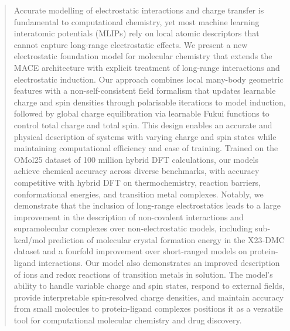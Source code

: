\documentclass[aps,%
superscriptaddress,
 amsmath,amssymb,
floatfix,
twocolumn
]{revtex4-2}
\begin{document}
\begin{abstract}
Accurate modelling of electrostatic interactions and charge transfer is fundamental to computational chemistry, yet most machine learning interatomic potentials (MLIPs) rely on local atomic descriptors that cannot capture long-range electrostatic effects. We present a new electrostatic foundation model for molecular chemistry that extends the MACE architecture with explicit treatment of long-range interactions and electrostatic induction. Our approach combines local many-body geometric features with a non-self-consistent field formalism that updates learnable charge and spin densities through polarisable iterations to model induction, followed by global charge equilibration via learnable Fukui functions to control total charge and total spin. This design enables an accurate and physical description of systems with varying charge and spin states while maintaining computational efficiency and ease of training. Trained on the OMol25 dataset of 100 million hybrid DFT calculations, our models achieve chemical accuracy across diverse benchmarks, with accuracy competitive with hybrid DFT on thermochemistry, reaction barriers, conformational energies, and transition metal complexes. Notably, we demonstrate that the inclusion of long-range electrostatics leads to a large improvement in the description of non-covalent interactions and supramolecular complexes over non-electrostatic models, including sub-kcal/mol prediction of molecular crystal formation energy in the X23-DMC dataset and a fourfold improvement over short-ranged models on protein-ligand interactions. Our model also demonstrates an improved description of ions and redox reactions of transition metals in solution. The model's ability to handle variable charge and spin states, respond to external fields, provide interpretable spin-resolved charge densities, and maintain accuracy from small molecules to protein-ligand complexes positions it as a versatile tool for computational molecular chemistry and drug discovery.
\end{abstract}

\maketitle
\end{document}
